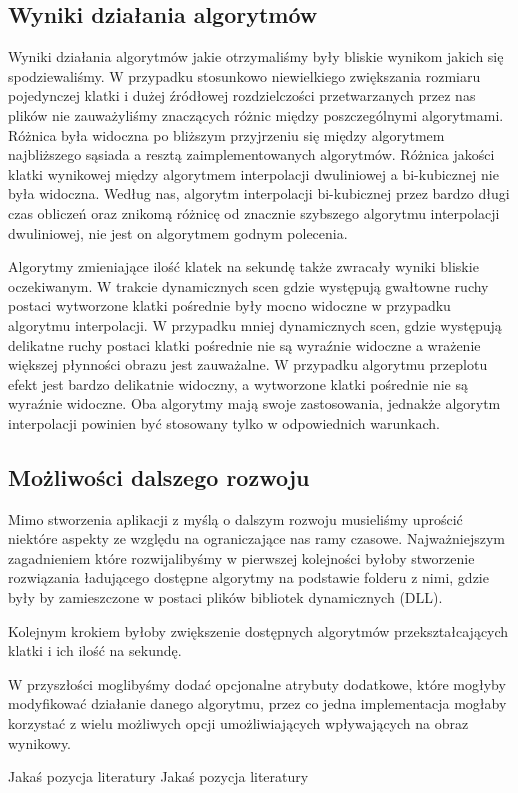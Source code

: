 \documentclass[twoside]{projektInzynierskiMS}
\begin{document}
\subsection{Wyniki działania algorytmów}
Wyniki działania algorytmów jakie otrzymaliśmy były bliskie wynikom jakich się spodziewaliśmy. W przypadku stosunkowo niewielkiego zwiększania rozmiaru pojedynczej klatki i dużej źródłowej rozdzielczości przetwarzanych przez nas plików nie zauważyliśmy znaczących różnic między poszczególnymi algorytmami. Różnica była widoczna po bliższym przyjrzeniu się między algorytmem najbliższego sąsiada a resztą zaimplementowanych algorytmów. Różnica jakości klatki wynikowej między algorytmem interpolacji dwuliniowej a bi-kubicznej nie była widoczna. Według nas, algorytm interpolacji bi-kubicznej przez bardzo długi czas obliczeń oraz znikomą różnicę od znacznie szybszego algorytmu interpolacji dwuliniowej, nie jest on algorytmem godnym polecenia.

Algorytmy zmieniające ilość klatek na sekundę także zwracały wyniki bliskie oczekiwanym. W trakcie dynamicznych scen gdzie występują gwałtowne ruchy postaci wytworzone klatki pośrednie były mocno widoczne w przypadku algorytmu interpolacji. W przypadku mniej dynamicznych scen, gdzie występują delikatne ruchy postaci klatki pośrednie nie są wyraźnie widoczne a wrażenie większej płynności obrazu jest zauważalne. W przypadku algorytmu przeplotu efekt jest bardzo delikatnie widoczny, a wytworzone klatki pośrednie nie są wyraźnie widoczne. Oba algorytmy mają swoje zastosowania, jednakże algorytm interpolacji powinien być stosowany tylko w odpowiednich warunkach.

\subsection{Możliwości dalszego rozwoju}
Mimo stworzenia aplikacji z myślą o dalszym rozwoju musieliśmy uprościć niektóre aspekty ze względu na ograniczające nas ramy czasowe. Najważniejszym zagadnieniem które rozwijalibyśmy w pierwszej kolejności byłoby stworzenie rozwiązania ładującego dostępne algorytmy na podstawie folderu z nimi, gdzie były by zamieszczone w postaci plików bibliotek dynamicznych (DLL).

Kolejnym krokiem byłoby zwiększenie dostępnych algorytmów przekształcających klatki i ich ilość na sekundę.

W przyszłości moglibyśmy dodać opcjonalne atrybuty dodatkowe, które mogłyby modyfikować działanie danego algorytmu, przez co jedna implementacja mogłaby korzystać z wielu możliwych opcji umożliwiających wpływających na obraz wynikowy.

\begin{thebibliography}{12}

 Jakaś pozycja literatury
 Jakaś pozycja literatury

\end{thebibliography}
\end{document}

